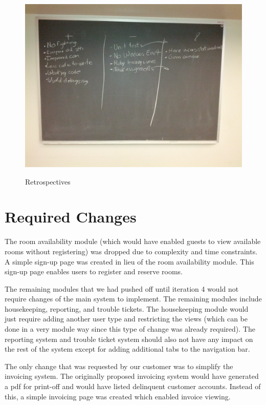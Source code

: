 \documentclass[12pt]{elsarticle}
\begin{document}
\begin{figure}[!ht]
	\centering
	\includegraphics[scale=0.15]{images/retrospective}
	\label{retrospective}
	\caption{Retrospectives}
\end{figure}

\section{Required Changes}

The room availability module (which would have enabled guests to view available rooms without registering) was dropped due to complexity and time constraints. A simple sign-up page was created in lieu of the room availability module. This sign-up page enables users to register and reserve rooms. 

The remaining modules that we had pushed off until iteration 4 would not require changes of the main system to implement. The remaining modules include housekeeping, reporting, and trouble tickets. The housekeeping module would just require adding another user type and restricting the views (which can be done in a very module way since this type of change was already required). The reporting system and trouble ticket system should also not have any impact on the rest of the system except for adding additional tabs to the navigation bar. 

The only change that was requested by our customer was to simplify the invoicing system. The originally proposed invoicing system would have generated a pdf for print-off and would have listed delinquent customer accounts. Instead of this, a simple invoicing page was created which enabled invoice viewing.
\end{document}
